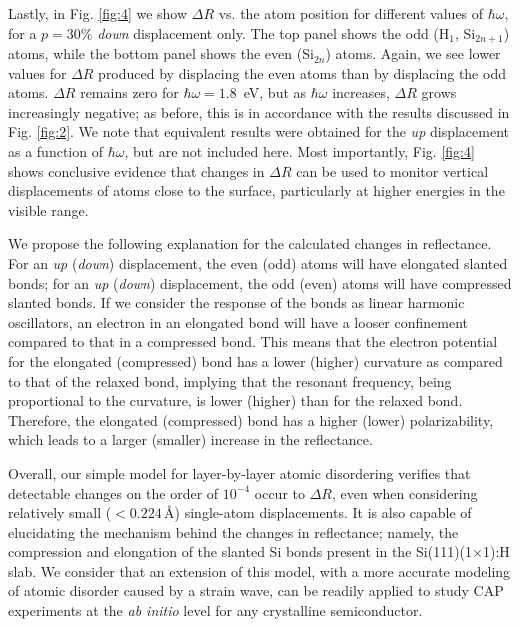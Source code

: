 \documentclass[pss]{wiley2sp} %
\begin{document}
Lastly, in Fig. \ref{fig:4} we show $\Delta R$ vs. the atom position for
different values of $\hbar\omega$, for a $p = 30\%$ \emph{down} displacement
only. The top panel shows the odd (H$_{1}$, Si$_{2n+1}$) atoms, while the bottom
panel shows the even (Si$_{2n}$) atoms. Again, we see lower values for $\Delta
R$ produced by displacing the even atoms than by displacing the odd atoms.
$\Delta R$ remains zero for $\hbar\omega=1.8$\, eV, but as $\hbar\omega$
increases, $\Delta R$ grows increasingly negative; as before, this is in
accordance with the results discussed in Fig. \ref{fig:2}. We note that
equivalent results were obtained for the \emph{up} displacement as a function of
$\hbar\omega$, but are not included here. Most importantly, Fig. \ref{fig:4}
shows conclusive evidence that changes in $\Delta R$ can be used to monitor
vertical displacements of atoms close to the surface, particularly at higher
energies in the visible range.

We propose the following explanation for the calculated changes in reflectance.
For an \emph{up} (\emph{down}) displacement, the even (odd) atoms will have
elongated slanted bonds; for an \emph{up} (\emph{down}) displacement, the odd
(even) atoms will have compressed slanted bonds. If we consider the response of
the bonds as linear harmonic oscillators, an electron in an elongated bond will
have a looser confinement compared to that in a compressed bond. This means that
the electron potential for the elongated (compressed) bond has a lower (higher)
curvature as compared to that of the relaxed bond, implying that the resonant
frequency, being proportional to the curvature, is lower (higher) than for the
relaxed bond. Therefore, the elongated (compressed) bond has a higher (lower)
polarizability, which leads to a {\color{red}larger (smaller) increase in the reflectance.}

Overall, our simple model for layer-by-layer atomic disordering verifies that
detectable changes on the order of $10^{-4}$ occur to $\Delta R$, even when
considering relatively small ($< 0.224$\,{\AA}) single-atom displacements. It is
also capable of elucidating the mechanism behind the changes in reflectance;
namely, the compression and elongation of the slanted Si bonds present in the
Si(111)(1$\times$1):H slab. We consider that an extension of this model, with a
more accurate modeling of atomic disorder caused by a strain wave, can be
readily applied to study CAP experiments at the \emph{ab initio} level for any
crystalline semiconductor.
\end{document}
